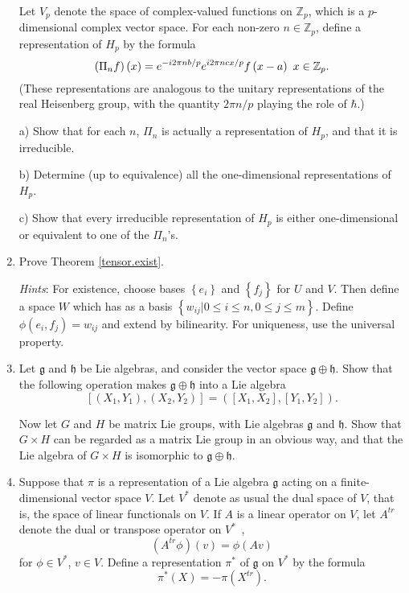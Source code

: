 \documentclass[12pt]{amsbook}
\let \frak = \mathfrak
\theoremstyle{plain}
\numberwithin{equation}{chapter}
\numberwithin{theorem}{chapter}
\begin{document}
\begin{enumerate}
Let $V_{p}$ denote the space of complex-valued functions on $\mathbb{Z}_{p}$,
which is a $p$-dimensional complex vector space. For each non-zero
$n\in\mathbb{Z}_{p}$, define a representation of $H_{p}$ by the formula
\[
\left(  \Pi_{n}f\right)  \left(  x\right)  =e^{-i2\pi nb/p}e^{i2\pi
ncx/p}f\left(  x-a\right)  \bigskip\ x\in\mathbb{Z}_{p}\text{.}%
\]
(These representations are analogous to the unitary representations of the
real Heisenberg group, with the quantity $2\pi n/p$ playing the role of
$\hbar$.)

a) Show that for each $n$, $\Pi_{n}$ is actually a representation of $H_{p}$,
and that it is irreducible.

b) Determine (up to equivalence) all the one-dimensional representations of
$H_{p}$.

c) Show that every irreducible representation of $H_{p}$ is either
one-dimensional or equivalent to one of the $\Pi_{n}$'s.

\item \label{universal}Prove Theorem \ref{tensor.exist}.

\textit{Hints}: For existence, choose bases $\left\{  e_{i}\right\}  $ and
$\left\{  f_{j}\right\}  $ for $U$ and $V$. Then define a space $W$ which has
as a basis $\left\{  w_{ij}\left|  0\leq i\leq n,0\leq j\leq m\right.
\right\}  $. Define $\phi(e_{i},f_{j})=w_{ij}$ and extend by bilinearity. For
uniqueness, use the universal property.

\item \label{direct.product}Let $\frak{g}$ and $\frak{h}$ be Lie algebras, and
consider the vector space $\frak{g}\oplus\frak{h}$. Show that the following
operation makes $\frak{g}\oplus\frak{h}$ into a Lie algebra
\[
\left[  (X_{1},Y_{1}),(X_{2},Y_{2})\right]  =\left(  [X_{1},X_{2}%
],[Y_{1},Y_{2}]\right)  \text{.}%
\]

Now let $G$ and $H$ be matrix Lie groups, with Lie algebras $\frak{g}$ and
$\frak{h}$. Show that $G\times H$ can be regarded as a matrix Lie group in an
obvious way, and that the Lie algebra of $G\times H$ is isomorphic to
$\frak{g}\oplus\frak{h}$.

\item \label{define.dual}Suppose that $\pi$ is a representation of a Lie
algebra $\frak{g}$ acting on a finite-dimensional vector space $V$. Let
$V^{\ast}$ denote as usual the dual space of $V$, that is, the space of linear
functionals on $V$. If $A$ is a linear operator on $V$, let $A^{tr}$ denote
the dual or transpose operator on $V^{\ast\text{ }}$,
\[
\left(  A^{tr}\phi\right)  \left(  v\right)  =\phi\left(  Av\right)
\]
for $\phi\in V^{\ast}$, $v\in V$. Define a representation $\pi^{\ast}$ of
$\frak{g}$ on $V^{\ast}$ by the formula
\[
\pi^{\ast}\left(  X\right)  =-\pi\left(  X^{tr}\right)  \text{.}%
\]


\end{enumerate}
\end{document}
